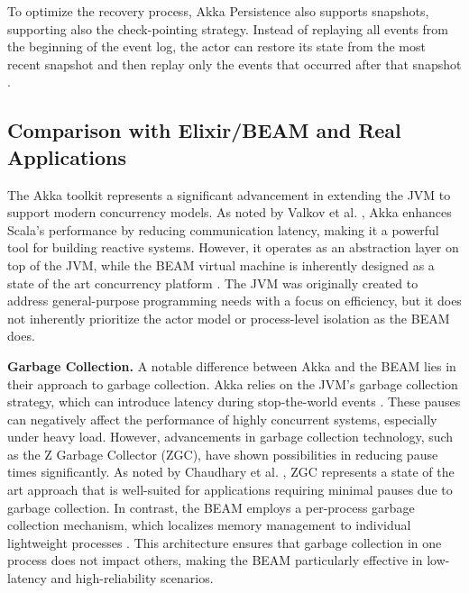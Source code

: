 To optimize the recovery process, Akka Persistence also supports snapshots, supporting also the check-pointing strategy. Instead of replaying all events from the beginning of the event log, the actor can restore its state from the most recent snapshot and then replay only the events that occurred after that snapshot \cite{Abraham2023,akka-docs}.

\subsection{Comparison with Elixir/BEAM and Real Applications}

The Akka toolkit represents a significant advancement in extending the \gls{JVM} to support modern concurrency models. As noted by Valkov et al. \cite{Valkov2018}, Akka enhances Scala’s performance by reducing communication latency, making it a powerful tool for building reactive systems. However, it operates as an abstraction layer on top of the \gls{JVM}, while the \gls{BEAM} virtual machine is inherently designed as a state of the art concurrency platform \cite{erlang-concurrency-blog}. The \gls{JVM} was originally created to address general-purpose programming needs with a focus on efficiency, but it does not inherently prioritize the actor model or process-level isolation as the \gls{BEAM} does.

\textbf{Garbage Collection.} A notable difference between Akka and the \gls{BEAM} lies in their approach to garbage collection. Akka relies on the \gls{JVM}’s garbage collection strategy, which can introduce latency during stop-the-world events \cite{akka-docs,Abraham2023}. These pauses can negatively affect the performance of highly concurrent systems, especially under heavy load. However, advancements in garbage collection technology, such as the Z Garbage Collector (ZGC), have shown possibilities in reducing pause times significantly. As noted by Chaudhary et al. \cite{Chaudhary2024}, ZGC represents a state of the art approach that is well-suited for applications requiring minimal pauses due to garbage collection. In contrast, the \gls{BEAM} employs a per-process garbage collection mechanism, which localizes memory management to individual lightweight processes \cite{Juric2024}. This architecture ensures that garbage collection in one process does not impact others, making the \gls{BEAM} particularly effective in low-latency and high-reliability scenarios.

